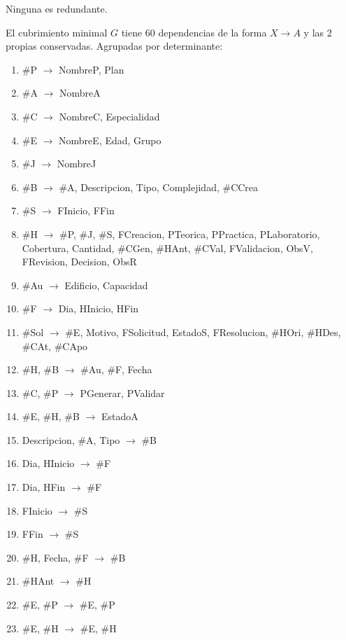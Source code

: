 Ninguna es redundante.


El cubrimiento minimal $G$ tiene 60 dependencias de la forma $X \to A$ y las 2 propias conservadas. Agrupadas por determinante:
\begin{enumerate}[label=g\arabic*,leftmargin=3em]
  \item \#P \ensuremath{\to} NombreP, Plan
  \item \#A \ensuremath{\to} NombreA
  \item \#C \ensuremath{\to} NombreC, Especialidad
  \item \#E \ensuremath{\to} NombreE, Edad, Grupo
  \item \#J \ensuremath{\to} NombreJ
  \item \#B \ensuremath{\to} \#A, Descripcion, Tipo, Complejidad, \#CCrea
  \item \#S \ensuremath{\to} FInicio, FFin
  \item \#H \ensuremath{\to} \#P, \#J, \#S, FCreacion, PTeorica, PPractica, PLaboratorio, Cobertura, Cantidad, \#CGen, \#HAnt, \#CVal, FValidacion, ObsV, FRevision, Decision, ObsR
  \item \#Au \ensuremath{\to} Edificio, Capacidad
  \item \#F \ensuremath{\to} Dia, HInicio, HFin
  \item \#Sol \ensuremath{\to} \#E, Motivo, FSolicitud, EstadoS, FResolucion, \#HOri, \#HDes, \#CAt, \#CApo
  \item \#H, \#B \ensuremath{\to} \#Au, \#F, Fecha
  \item \#C, \#P \ensuremath{\to} PGenerar, PValidar
  \item \#E, \#H, \#B \ensuremath{\to} EstadoA
  \item Descripcion, \#A, Tipo \ensuremath{\to} \#B
  \item Dia, HInicio \ensuremath{\to} \#F
  \item Dia, HFin \ensuremath{\to} \#F
  \item FInicio \ensuremath{\to} \#S
  \item FFin \ensuremath{\to} \#S
  \item \#H, Fecha, \#F \ensuremath{\to} \#B
  \item \#HAnt \ensuremath{\to} \#H
  \item \#E, \#P \ensuremath{\to} \#E, \#P
  \item \#E, \#H \ensuremath{\to} \#E, \#H
\end{enumerate}
